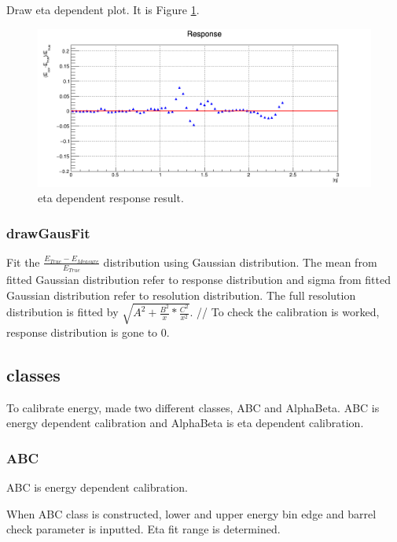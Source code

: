 \documentclass{cernrep}
\begin{document}
Draw eta dependent plot. It is Figure \ref{EtaDependent}.

\begin{figure}[ht]
\includegraphics[width=1.0\textwidth]{fig/corrEtaDependenceEH_JME_GT_sample.png}
\caption{eta dependent response result.}
\label{EtaDependent}
\end{figure}

\subsubsection {drawGausFit}

Fit the $\frac{E_{True}-E_{Measure}}{E_{True}}$ distribution  using Gaussian distribution. The mean from fitted Gaussian distribution refer to response distribution and sigma from  fitted Gaussian distribution refer to resolution distribution. The full resolution distribution is fitted by $\sqrt{A^2+\frac{B^2}{x}*\frac{C^2}{x^2}}$. //
To check the calibration is worked, response distribution is gone to 0.

\subsection{classes}

To calibrate energy, made two different classes, ABC and AlphaBeta. ABC is energy dependent calibration and AlphaBeta is eta dependent calibration.

\subsubsection{ABC}

ABC is energy dependent calibration.


When ABC class is constructed, lower and upper energy bin edge and barrel check parameter is inputted. Eta fit range is determined.
\end{document}
